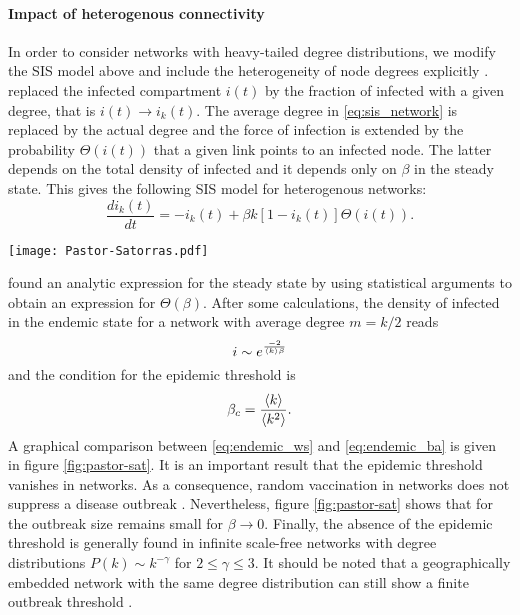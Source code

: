 \paragraph{Impact of heterogenous connectivity\color{Cayenne}{.}}
In order to consider networks with heavy-tailed degree distributions, we modify the SIS model above and include the heterogeneity of node degrees explicitly \citep{Pastor-Satorras_vespi:2001}.
\citeauthor{Pastor-Satorras_vespi:2001} replaced the infected compartment $i(t)$ by the fraction of infected with a given degree, that is $i(t)\rightarrow i_k(t)$.
The average degree in \eqref{eq:sis_network} is replaced by the actual degree and the force of infection is extended by the probability $\Theta (i(t))$ that a given link points to an infected node.
The latter depends on the total density of infected and it depends only on $\beta $ in the steady state.
This gives the following SIS model for heterogenous networks:
\begin{equation}\label{eq:sis_het_network}
\frac{di_k(t)}{dt}=-i_k(t)+\beta k [1-i_k(t)] \Theta (i(t)).
\end{equation}
%
\begin{SCfigure}
\texttt{[image: Pastor-Satorras.pdf]}
\caption{Fraction of infected in the endemic state for an SIS model.
The figure reveals the disappearance of the epidemic threshold for in \BA networks (red).
The epidemic threshold remains finite (here: $\beta _c=1/6$) for homogenous networks and $\beta _c \rightarrow 0$ for \BA networks.
From \citet{Pastor-Satorras_vespi:2001}.
}
\label{fig:pastor-sat}
\end{SCfigure}

%
\citeauthor{Pastor-Satorras_vespi:2001} found an analytic expression for the steady state by using statistical arguments to obtain an expression for $\Theta (\beta )$.
After some calculations, the density of infected in the endemic state for a \BA network with average degree $m=k/2$ reads
\begin{equation}\label{eq:endemic_ba}
i \sim e^{\frac{-2}{\left< k \right>\beta }}
\end{equation}
and the condition for the epidemic threshold is \citep{pastor-sat_2}
\begin{equation}\label{eq:degree_threshold}
\beta _c=\frac{\left< k \right>}{\left< k^2 \right>} .
\end{equation}
A graphical comparison between \eqref{eq:endemic_ws} and \eqref{eq:endemic_ba} is given in figure \ref{fig:pastor-sat}.
It is an important result that the epidemic threshold vanishes in \BA networks.
As a consequence, random vaccination in \BA networks does not suppress a disease outbreak \citep{Keeling:2005}.
Nevertheless, figure \ref{fig:pastor-sat} shows that for the outbreak size remains small for $\beta \rightarrow 0$.
Finally, the absence of the epidemic threshold is generally found in infinite scale-free networks with degree distributions $P(k)\sim k^{-\gamma }$ for $2\leqslant \gamma \leqslant 3$.
It should be noted that a geographically embedded network with the same degree distribution can still show a finite outbreak threshold \citep{Sander20031}.

